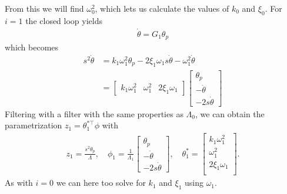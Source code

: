 \documentclass[]{article}
\begin{document}
From this we will find $\omega_0^2$, which lets us calculate the values of $k_0$ and $\xi_0$. For $i = 1$ the closed loop yields
\begin{equation}\begin{aligned}
\dot \theta = G_1 \theta_p
\end{aligned}\end{equation}
which becomes
\begin{equation}\begin{aligned}
s^2 \dot \theta &= k_1 \omega_1^2 \theta_p - 2 \xi_1 \omega_1 s \dot \theta - \omega_1^2 \dot \theta \\
&=
\begin{bmatrix}
k_1 \omega_1^2 & \omega_1^2 & 2 \xi_1 \omega_1
\end{bmatrix}
\begin{bmatrix}
\theta_p\\
-\dot \theta \\
- 2 s \dot \theta
\end{bmatrix}
\end{aligned}\end{equation}
Filtering with a filter with the same properties as $\Lambda_0$, we can obtain the parametrization $z_1 = \theta^{*\top}_1 \phi$ with
\begin{equation}\begin{aligned}
z_1 = \frac{s^2 \theta_p}{\Lambda}, \quad
\phi_1 = \frac{1}{\Lambda_1}
\begin{bmatrix}
\theta_p\\
-\dot \theta \\
- 2 s \dot \theta
\end{bmatrix}, \quad
\theta_1^{*} =
\begin{bmatrix}
k_1 \omega_1^2 \\
 \omega_1^2 \\
 2 \xi_1 \omega_1\\
\end{bmatrix}.
\end{aligned}\end{equation}
As with $i = 0$ we can here too solve for $k_1$ and $\xi_1$ using $\omega_1$.
\end{document}
